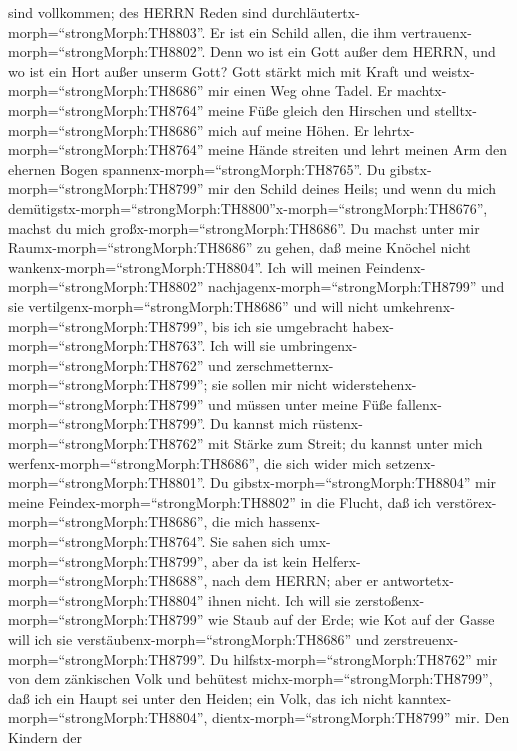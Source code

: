 sind vollkommen; des HERRN Reden sind
durchläutertx-morph=``strongMorph:TH8803''. Er ist ein Schild allen, die
ihm vertrauenx-morph=``strongMorph:TH8802''.  Denn wo ist
ein Gott außer dem HERRN, und wo ist ein Hort außer unserm Gott?
 Gott stärkt mich mit Kraft und
weistx-morph=``strongMorph:TH8686'' mir einen Weg ohne Tadel.
 Er machtx-morph=``strongMorph:TH8764'' meine Füße gleich
den Hirschen und stelltx-morph=``strongMorph:TH8686'' mich auf meine
Höhen.  Er lehrtx-morph=``strongMorph:TH8764'' meine Hände
streiten und lehrt meinen Arm den ehernen Bogen
spannenx-morph=``strongMorph:TH8765''.  Du
gibstx-morph=``strongMorph:TH8799'' mir den Schild deines Heils; und
wenn du mich
demütigstx-morph=``strongMorph:TH8800''\textbar x-morph=``strongMorph:TH8676'',
machst du mich großx-morph=``strongMorph:TH8686''.  Du
machst unter mir Raumx-morph=``strongMorph:TH8686'' zu gehen, daß meine
Knöchel nicht wankenx-morph=``strongMorph:TH8804''.  Ich
will meinen Feindenx-morph=``strongMorph:TH8802''
nachjagenx-morph=``strongMorph:TH8799'' und sie
vertilgenx-morph=``strongMorph:TH8686'' und will nicht
umkehrenx-morph=``strongMorph:TH8799'', bis ich sie umgebracht
habex-morph=``strongMorph:TH8763''.  Ich will sie
umbringenx-morph=``strongMorph:TH8762'' und
zerschmetternx-morph=``strongMorph:TH8799''; sie sollen mir nicht
widerstehenx-morph=``strongMorph:TH8799'' und müssen unter meine Füße
fallenx-morph=``strongMorph:TH8799''.  Du kannst mich
rüstenx-morph=``strongMorph:TH8762'' mit Stärke zum Streit; du kannst
unter mich werfenx-morph=``strongMorph:TH8686'', die sich wider mich
setzenx-morph=``strongMorph:TH8801''.  Du
gibstx-morph=``strongMorph:TH8804'' mir meine
Feindex-morph=``strongMorph:TH8802'' in die Flucht, daß ich
verstörex-morph=``strongMorph:TH8686'', die mich
hassenx-morph=``strongMorph:TH8764''.  Sie sahen sich
umx-morph=``strongMorph:TH8799'', aber da ist kein
Helferx-morph=``strongMorph:TH8688'', nach dem HERRN; aber er
antwortetx-morph=``strongMorph:TH8804'' ihnen nicht.  Ich
will sie zerstoßenx-morph=``strongMorph:TH8799'' wie Staub auf der Erde;
wie Kot auf der Gasse will ich sie
verstäubenx-morph=``strongMorph:TH8686'' und
zerstreuenx-morph=``strongMorph:TH8799''.  Du
hilfstx-morph=``strongMorph:TH8762'' mir von dem zänkischen Volk und
behütest michx-morph=``strongMorph:TH8799'', daß ich ein Haupt sei unter
den Heiden; ein Volk, das ich nicht
kanntex-morph=``strongMorph:TH8804'',
dientx-morph=``strongMorph:TH8799'' mir.  Den Kindern der

